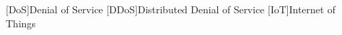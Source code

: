 \begin{acronym}[IEEE]
	[DoS]{Denial of Service}
	[DDoS]{Distributed Denial of Service}
	[IoT]{Internet of Things}
\end{acronym}
